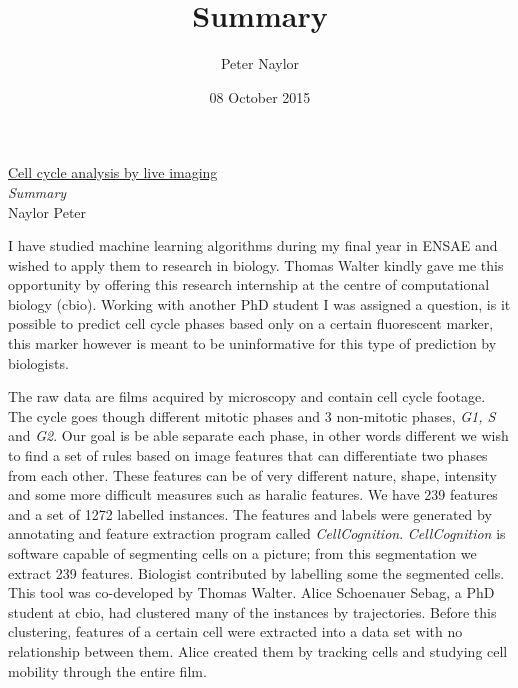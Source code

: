 \documentclass{article}
\title{Summary}
\author{Peter Naylor}
\date{08 October 2015}
\begin{document}
\begin{center}
\begin{Large}
\underline{Cell cycle analysis by live imaging}\\
\vspace{0.3cm}
\textit{Summary}\\
Naylor Peter
\end{Large}
\end{center}

\vspace{3cm} I have studied machine learning algorithms during my final year in ENSAE and wished to apply them to research in biology. Thomas Walter kindly gave me this opportunity by offering this research internship at the centre of computational biology (cbio). Working with another PhD student I was assigned a question, is it possible to predict cell cycle phases based only on a certain fluorescent marker, this marker however is meant to be uninformative for this type of prediction by biologists.

\bigskip

The raw data are films acquired by microscopy and contain cell cycle footage. The cycle goes though different mitotic phases and 3 non-mitotic phases, \textit{G1, S} and \textit{G2}. Our goal is be able separate each phase, in other words different we wish to find a set of rules based on image features that can differentiate two phases from each other. These features can be of very different nature, shape, intensity and some more difficult measures such as haralic features. We have 239 features and a set of 1272 labelled instances. The features and labels were generated by annotating and feature extraction program called \textit{CellCognition}. \textit{CellCognition} is software capable of segmenting cells on a picture; from this segmentation we extract 239 features. Biologist contributed by labelling some the segmented cells. This tool was co-developed by Thomas Walter. Alice Schoenauer Sebag, a PhD student at cbio, had clustered many of the instances by trajectories. Before this clustering, features of a certain cell were extracted into a data set with no relationship between them. Alice created them by tracking cells and studying cell mobility through the entire film.

\bigskip
\end{document}
